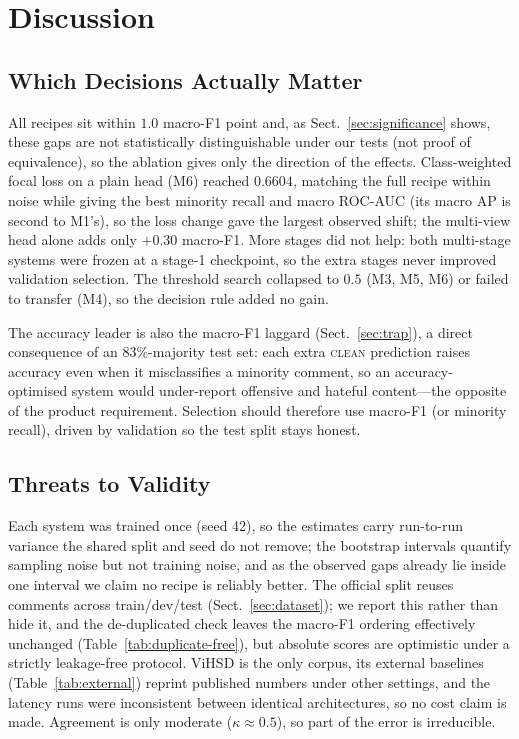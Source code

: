 \section{Discussion}
\label{sec:discussion}

\subsection{Which Decisions Actually Matter}
All recipes sit within $1.0$ macro-F1 point and, as
Sect.~\ref{sec:significance} shows, these gaps are not statistically
distinguishable under our tests (not proof of equivalence), so the ablation gives
only the direction of the effects.
Class-weighted focal loss on a plain head (M6) reached $0.6604$, matching the full
recipe within noise while giving the best minority recall and macro ROC-AUC (its
macro AP is second to M1's), so
the loss change gave the largest observed shift; the multi-view
head alone adds only $+0.30$ macro-F1.  More stages did not help: both
multi-stage systems were frozen
at a stage-1 checkpoint, so the extra stages never improved validation selection.
The threshold search collapsed to
$0.5$ (M3, M5, M6) or failed to transfer (M4), so the decision rule added no gain.

The accuracy leader is also the macro-F1 laggard (Sect.~\ref{sec:trap}), a direct
consequence of an 83\%-majority test set: each extra \textsc{clean} prediction
raises accuracy even when it misclassifies a minority comment, so an
accuracy-optimised system would under-report offensive and hateful content---the
opposite of the product requirement.  Selection should therefore use macro-F1 (or
minority recall), driven by validation so the test split stays honest.

\subsection{Threats to Validity}
\label{sec:threats}
Each system was trained once (seed 42), so the estimates carry run-to-run variance
the shared split and seed do not remove; the bootstrap intervals quantify sampling
noise but not training noise, and as the observed gaps already lie inside one
interval we claim no recipe is reliably better.  The official split reuses comments
across train/dev/test (Sect.~\ref{sec:dataset}); we report this rather than hide it,
and the de-duplicated check leaves the macro-F1 ordering effectively unchanged
(Table~\ref{tab:duplicate-free}), but absolute scores are
optimistic under a strictly leakage-free protocol.  ViHSD is the only corpus, its
external baselines (Table~\ref{tab:external}) reprint published numbers under other
settings, and the latency runs were inconsistent between identical architectures,
so no cost claim is made.  Agreement is only moderate ($\kappa\approx0.5$), so part
of the error is irreducible.

